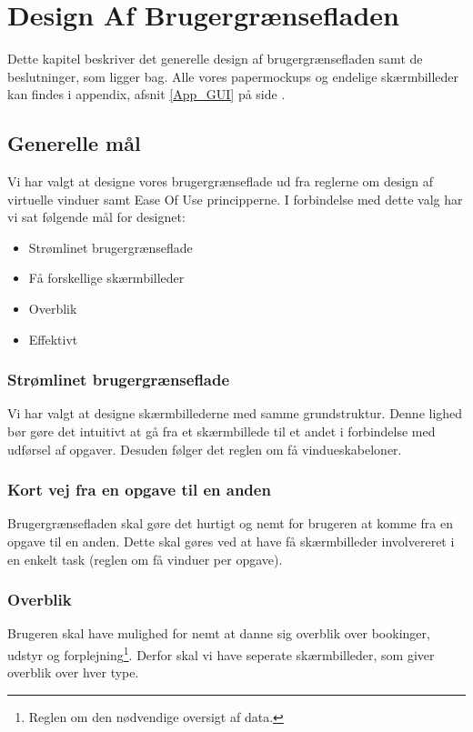 \chapter{Design Af Brugergrænsefladen}
\label{Design_G}
Dette kapitel beskriver det generelle design af brugergrænsefladen samt de beslutninger, som ligger bag. Alle vores papermockups og endelige skærmbilleder kan findes i appendix, afsnit \ref{App_GUI} på side \pageref{App_GUI}.

\section{Generelle mål}
\label{Design_G_Goals}
Vi har valgt at designe vores brugergrænseflade ud fra reglerne om design af virtuelle vinduer\cite[s. 169]{SL_UID} samt Ease Of Use principperne\cite[s. 9]{SL_UID}. I forbindelse med dette valg har vi sat følgende mål for designet:
\begin{itemize}
\item Strømlinet brugergrænseflade
\item Få forskellige skærmbilleder
\item Overblik
\item Effektivt
\end{itemize}

\subsection{Strømlinet brugergrænseflade}
Vi har valgt at designe skærmbillederne med samme grundstruktur. Denne lighed bør gøre det intuitivt at gå fra et skærmbillede til et andet i forbindelse med udførsel af opgaver. Desuden følger det reglen om få vindueskabeloner.

\subsection{Kort vej fra en opgave til en anden}
Brugergrænsefladen skal gøre det hurtigt og nemt for brugeren at komme fra en opgave til en anden. Dette skal gøres ved at have få skærmbilleder involvereret i en enkelt task (reglen om få vinduer per opgave).

\subsection{Overblik}
Brugeren skal have mulighed for nemt at danne sig overblik over bookinger, udstyr og forplejning\footnote{Reglen om den nødvendige oversigt af data.}. Derfor skal vi have seperate skærmbilleder, som giver overblik over hver type.

